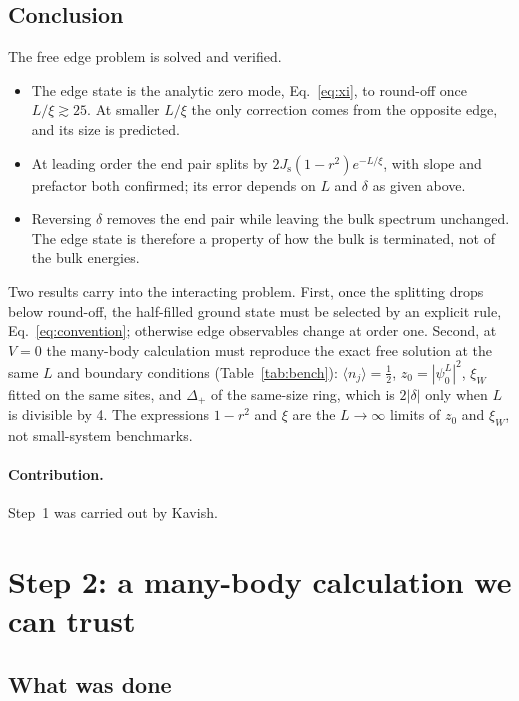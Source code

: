 \documentclass[11pt,a4paper]{article}
\newcommand{\Js}{J_{\mathrm{s}}}
\begin{document}
\subsection{Conclusion}

The free edge problem is solved and verified.
\begin{itemize}
  \item The edge state is the analytic zero mode, Eq.~\eqref{eq:xi}, to round-off once $L/\xi\gtrsim25$.
  At smaller $L/\xi$ the only correction comes from the opposite edge, and its size is predicted.
  \item At leading order the end pair splits by $2\Js(1-r^2)e^{-L/\xi}$, with slope and prefactor both confirmed; its error depends on $L$ and $\delta$ as given above.
  \item Reversing $\delta$ removes the end pair while leaving the bulk spectrum unchanged.
  The edge state is therefore a property of how the bulk is terminated, not of the bulk energies.
\end{itemize}
Two results carry into the interacting problem.
First, once the splitting drops below round-off, the half-filled ground state must be selected by an explicit rule, Eq.~\eqref{eq:convention}; otherwise edge observables change at order one.
Second, at $V=0$ the many-body calculation must reproduce the exact free solution at the same $L$ and boundary conditions (Table~\ref{tab:bench}): $\langle n_j\rangle = \tfrac12$, $z_0 = |\psi^L_0|^2$, $\xi_W$ fitted on the same sites, and $\Delta_+$ of the same-size ring, which is $2|\delta|$ only when $L$ is divisible by 4.
The expressions $1-r^2$ and $\xi$ are the $L\to\infty$ limits of $z_0$ and $\xi_W$, not small-system benchmarks.

\paragraph{Contribution.} Step~1 was carried out by Kavish.

\section{Step 2: a many-body calculation we can trust}
\label{sec:step2}

\subsection{What was done}
\end{document}
